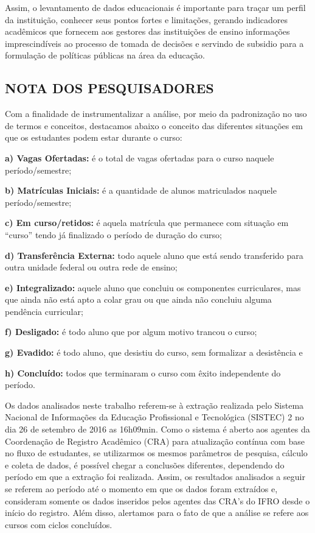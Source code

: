 \documentclass[article,12pt,onesidea,4paper,english,brazil]{abntex2}
\begin{document}
	Assim, o levantamento de dados educacionais é importante para traçar um perfil da
	instituição, conhecer seus pontos fortes e limitações, gerando indicadores acadêmicos que
	fornecem aos gestores das instituições de ensino informações imprescindíveis ao processo de
	tomada de decisões e servindo de subsidio para a formulação de políticas públicas na área da
	educação.
	
	\subsection*{NOTA DOS PESQUISADORES}
	Com a finalidade de instrumentalizar a análise, por meio da padronização no uso de termos e
	conceitos, destacamos abaixo o conceito das diferentes situações em que os estudantes podem
	estar durante o curso:
	
	\textbf{a) Vagas Ofertadas:} é o total de vagas ofertadas para o curso naquele período/semestre;
	
	\textbf{b) Matrículas Iniciais:} é a quantidade de alunos matriculados naquele período/semestre;
	
	\textbf{c) Em curso/retidos:} é aquela matrícula que permanece com situação em “curso” tendo já
	finalizado o período de duração do curso;
	
	\textbf{d) Transferência Externa:} todo aquele aluno que está sendo transferido para outra unidade
	federal ou outra rede de ensino;
	
	\textbf{e) Integralizado:} aquele aluno que concluiu os componentes curriculares, mas que ainda
	não está apto a colar grau ou que ainda não concluiu alguma pendência curricular;
	
	\textbf{f) Desligado:} é todo aluno que por algum motivo trancou o curso;
	
	\textbf{g) Evadido:} é todo aluno, que desistiu do curso, sem formalizar a desistência e
	
	\textbf{h) Concluído:} todos que terminaram o curso com êxito independente do período.
	
	Os dados analisados neste trabalho referem-se à extração realizada pelo Sistema Nacional de
	Informações da Educação Profissional e Tecnológica (SISTEC)
	2
	no dia 26 de setembro de 2016
	as 16h09min. Como o sistema é aberto aos agentes da Coordenação de Registro Acadêmico
	(CRA) para atualização contínua com base no fluxo de estudantes, se utilizarmos os mesmos
	parâmetros de pesquisa, cálculo e coleta de dados, é possível chegar a conclusões diferentes,
	dependendo do período em que a extração foi realizada. Assim, os resultados analisados a seguir
	se referem ao período até o momento em que os dados foram extraídos e, consideram somente os
	dados inseridos pelos agentes das CRA’s do IFRO desde o início do registro. Além disso,
	alertamos para o fato de que a análise se refere aos cursos com ciclos concluídos.
	
\end{document}
